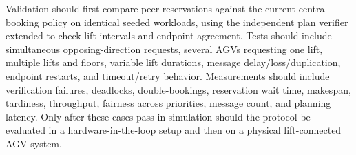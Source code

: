 \documentclass[11pt]{article}
\begin{document}
Validation should first compare peer reservations against the current
central booking policy on identical seeded workloads, using the independent
plan verifier extended to check lift intervals and endpoint agreement. Tests
should include simultaneous opposing-direction requests, several AGVs
requesting one lift, multiple lifts and floors, variable lift durations,
message delay/loss/duplication, endpoint restarts, and timeout/retry
behavior. Measurements should include verification failures, deadlocks,
double-bookings, reservation wait time, makespan, tardiness, throughput,
fairness across priorities, message count, and planning latency. Only after
these cases pass in simulation should the protocol be evaluated in a
hardware-in-the-loop setup and then on a physical lift-connected AGV system.
\end{document}
